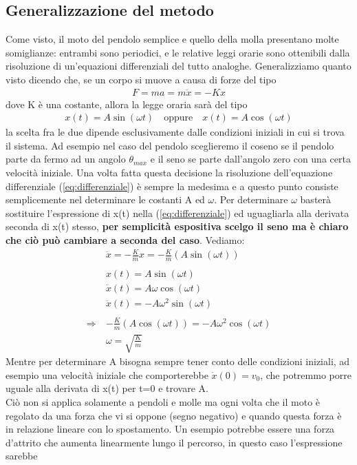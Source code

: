 \documentclass[10pt,a4paper]{article}
\begin{document}
\subsection{Generalizzazione del metodo}
Come visto, il moto del pendolo semplice e quello della molla presentano molte somiglianze: entrambi sono periodici, e le relative leggi orarie sono ottenibili dalla risoluzione di un'equazioni differenziali del tutto analoghe. Generalizziamo quanto visto dicendo che, se un corpo si muove a causa di forze del tipo
\begin{align}\label{eq:differenziale}
	F= ma = m \ddot{x} = -K x
\end{align}
dove K è una costante, allora la legge oraria sarà del tipo
\begin{align*}
	x(t) = A\sin(\omega t) \quad \text{oppure} \quad x(t) = A\cos(\omega t)
\end{align*}
la scelta fra le due dipende esclusivamente dalle condizioni iniziali in cui si trova il sistema. Ad esempio nel caso del pendolo sceglieremo il coseno se il pendolo parte da fermo ad un angolo $\theta_{max}$ e il seno se parte dall'angolo zero con una certa velocità iniziale. Una volta fatta questa decisione la risoluzione dell'equazione differenziale (\ref{eq:differenziale}) è sempre la medesima e a questo punto consiste semplicemente nel determinare le costanti A ed $\omega$. Per determinare $\omega$ basterà sostituire l'espressione di x(t) nella (\ref{eq:differenziale}) ed uguagliarla alla derivata seconda di x(t) stesso, \textbf{per semplicità espositiva scelgo il seno ma è chiaro che ciò può cambiare a seconda del caso}. Vediamo:
\begin{align*}
	&\ddot{x} = -\frac{K}{m} x = -\frac{K}{m}(A\sin(\omega t))\\\\
	&x(t) = A\sin(\omega t)\\
	&\dot{x}(t) = A\omega\cos(\omega t)\\
	&\ddot{x}(t) = -A\omega^2 \sin(\omega t)\\\\
	\Rightarrow\ &-\frac{K}{m}(A\cos(\omega t)) =  -A\omega^2 \cos (\omega t)\\
	&\omega = \sqrt{\frac{K}{m}}
\end{align*} 
Mentre per determinare A bisogna sempre tener conto delle condizioni iniziali, ad esempio una velocità iniziale che comporterebbe $\dot{x}(0)= v_0$, che potremmo porre uguale alla derivata di x(t) per t=0 e trovare A.\\
Ciò non si applica solamente a pendoli e molle ma ogni volta che il moto è regolato da una forza che vi si oppone (segno negativo) e quando questa forza è in relazione lineare con lo spostamento. Un esempio potrebbe essere una forza d'attrito che aumenta linearmente lungo il percorso, in questo caso l'espressione sarebbe
\end{document}
